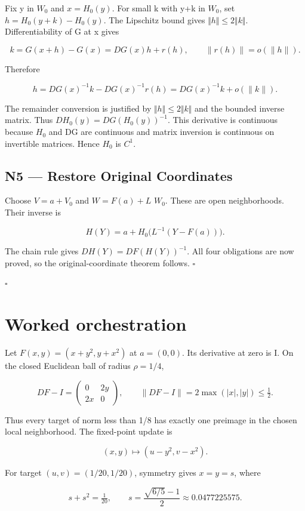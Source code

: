 \documentclass[preprint,12pt,aps,pra,showkeys,amsmath,amssymb,superscriptaddress,floatfix]{revtex4-2}
\theoremstyle{definition}
\theoremstyle{remark}
\begin{document}
Fix y in \(W_0\) and \(x=H_0(y)\). For small k with y+k in \(W_0\), set
\(h=H_0(y+k)-H_0(y)\). The Lipschitz bound gives
\(\Vert h\Vert \le 2\Vert k\Vert\). Differentiability of G at x gives

\[k=G(x+h)-G(x)=DG(x)h+r(h),\qquad\|r(h)\|=o(\|h\|).\]

Therefore

\[h=DG(x)^{-1}k-DG(x)^{-1}r(h)=DG(x)^{-1}k+o(\|k\|).\]

The remainder conversion is justified by
\(\Vert h\Vert \le 2\Vert k\Vert\) and the bounded inverse matrix. Thus
\(DH_0(y)=DG(H_0(y))^{-1}\). This derivative is continuous because
\(H_0\) and DG are continuous and matrix inversion is continuous on
invertible matrices. Hence \(H_0\) is \(C^{1}\).

\subsection{N5 --- Restore Original
Coordinates}\label{n5-restore-original-coordinates}

Choose \(V=a+V_0\) and \(W=F(a)+L\) \(W_0\). These are open
neighborhoods. Their inverse is

\[H(Y)=a+H_0\big(L^{-1}(Y-F(a))\big).\]

The chain rule gives \(DH(Y)=DF(H(Y))^{-1}\). All four obligations are
now proved, so the original-coordinate theorem follows. \(\square\)

\hfill$\square$

\section{Worked orchestration}

Let \(F(x,y)=(x+y^2,y+x^2)\) at \(a=(0,0)\). Its derivative at zero is
I. On the closed Euclidean ball of radius \(\rho =1/4\),

\[DF-I=\begin{pmatrix}0&2y\\2x&0\end{pmatrix},\qquad\|DF-I\|=2\max(|x|,|y|)\le\tfrac12.\]

Thus every target of norm less than 1/8 has exactly one preimage in the
chosen local neighborhood. The fixed-point update is

\[(x,y)\longmapsto(u-y^2,v-x^2).\]

For target \((u,v)=(1/20,1/20)\), symmetry gives \(x=y=s\), where

\[s+s^2=\tfrac1{20},\qquad s=\frac{\sqrt{6/5}-1}{2}\approx0.0477225575.\]
\end{document}
